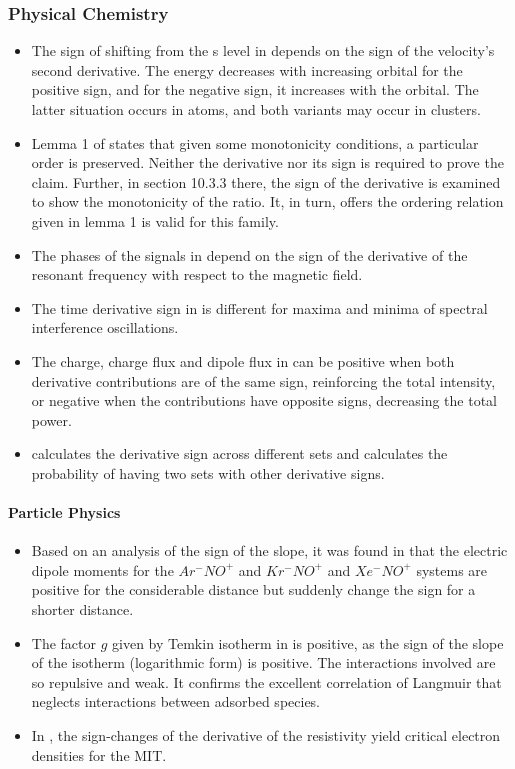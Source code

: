 \documentclass[11pt]{book}
\begin{document}
\subsubsection{Physical Chemistry}
\begin{itemize}
\item The sign of shifting from the s level in \cite{shpatakovskaya2001quasiclassical}
depends on the sign of the velocity's second derivative. The energy
decreases with increasing orbital for the positive sign, and for the
negative sign, it increases with the orbital. The latter situation
occurs in atoms, and both variants may occur in clusters.
\item Lemma 1 of \cite{shevkunov2011effect}
states that given some monotonicity conditions, a particular order
is preserved. Neither the derivative nor its sign is required to prove
the claim. Further, in section 10.3.3 there, the sign of the derivative
is examined to show the monotonicity of the ratio. It, in turn, offers
the ordering relation given in lemma 1 is valid for this family.
\item The phases of the signals in \cite{tarasov2011observation}
depend on the sign of the derivative of the resonant frequency with
respect to the magnetic field.
\item The time derivative sign in \cite{chetvertukhin2012femtosecond}
is different for maxima and minima of spectral interference oscillations.
\item The charge, charge flux and dipole flux in \cite{silva2014atomic}
can be positive when both derivative contributions are of the same
sign, reinforcing the total intensity, or negative when the contributions
have opposite signs, decreasing the total power.
\item \cite{adam2021nonmonotonic}
calculates the derivative sign across different sets and calculates
the probability of having two sets with other derivative signs.
\end{itemize}
\paragraph{Particle Physics}
\begin{itemize}
\item Based on an analysis of the sign of the slope, it was found in \cite{orek2016ab}
that the electric dipole moments for the $Ar^{-}NO^{+}$
and $Kr^{-}NO^{+}$ and $Xe^{-}NO^{+}$
systems are positive for the considerable distance but suddenly change
the sign for a shorter distance.
\item The factor $g$ given by Temkin isotherm in \cite{abidar2016orthophosphate}
is positive, as the sign of the slope of the isotherm (logarithmic
form) is positive. The interactions involved are so repulsive and
weak. It confirms the excellent correlation of Langmuir that neglects
interactions between adsorbed species.
\item In \cite{melnikov2020metallic},
the sign-changes of the derivative of the resistivity yield critical
electron densities for the MIT.
\end{itemize}
\end{document}
